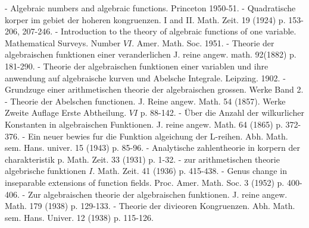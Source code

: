 \begin{thebibliography}{99}
 - Algebraic numbers and algebraic
  functions. Princeton 1950-51. 
 - Quadratische korper im gebiet der hoheren
  kongruenzen. I and II. Math. Zeit. 19 (1924) p. 153-206,
  207-246. 
 - Introduction to the theory of algebraic
  functions of one variable. Mathematical Surveys. Number
  $VI$. Amer. Math. Soc. 1951. 
 - Theorie der algebraischen
  funktionen einer veranderlichen J. reine angew. math. 92(1882)
  p. 181-290. 
 - Theorie der algebraischen
  funktionen einer variablen und ihre anwendung auf algebraische
  kurven und Abelsche Integrale. Leipzing. 1902. 
 - Grundzuge einer arithmetischen theorie
  der algebraischen grossen. Werke Band 2. 
 - Theorie der Abelschen functionen. J. Reine
  angew. Math. 54 (1857). Werke Zweite Auflage Erste Abtheilung. $VI$
  p. 88-142. 
 - \"{U}ber die Anzahl der wilkurlicher
  Konstanten in algebraischen Funktionen. J. reine angew. Math. 64
  (1865) p. 372-376. 
 - Ein neuer bewies fur
  die Funktion algeichung der
  L-reihen. Abh. Math. sem. Hans. univer. 15 (1943) p. 85-96. 
 - Analytische zahlentheorie in korpern
  der charakteristik p. Math. Zeit. 33 (1931) p. 1-32. 
 - zur arithmetischen theorie algebrische
  funktionen $I$. Math. Zeit. 41 (1936) p. 415-438. 
 - Genus change in inseparable extensions of
  function fields. Proc. Amer. Math. Soc. 3 (1952) p. 400-406. 
 - Zur algebraischen theorie der algebraischen
  funktionen. J. reine angew. Math. 179 (1938) p. 129-133. 
 - Theorie der divieoren
  Kongruenzen. Abh. Math. sem. Hans. Univer. 12 (1938) p. 115-126. 
\end{thebibliography}
